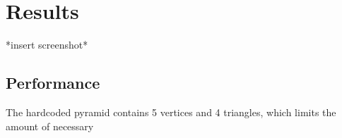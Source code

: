 \section{Results}
*insert screenshot*

\subsection{Performance}
The hardcoded pyramid contains 5 vertices and 4 triangles, which limits the amount of necessary 